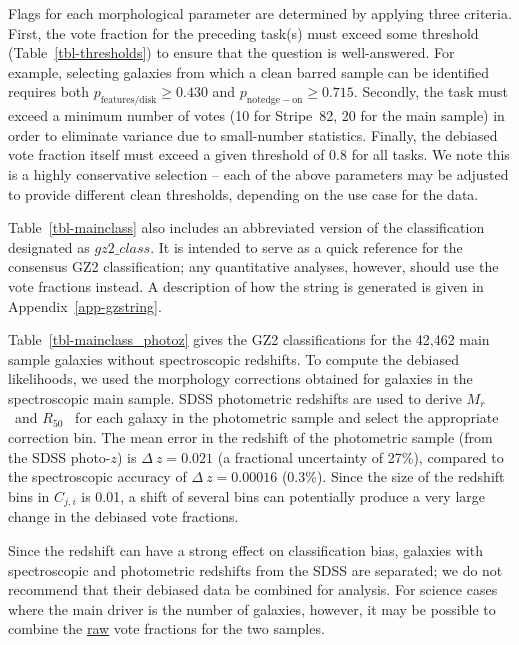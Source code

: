 \documentclass[useAMS,usenatbib]{mn2e}
\newcommand{\mr}{$M_r$}
\newcommand{\rfifty}{$R_{50}$}
\begin{document}
Flags for each morphological parameter are determined by applying three criteria. First, the vote fraction for the preceding task(s) must exceed some threshold (Table~\ref{tbl-thresholds}) to ensure that the question is well-answered. For example, selecting galaxies from which a clean barred sample can be identified requires both $p_\mathrm{features/disk}\geq0.430$ and $p_\mathrm{not edge-on}\geq0.715$. Secondly, the task must exceed a minimum number of votes (10 for Stripe~82, 20 for the main sample) in order to eliminate variance due to small-number statistics. Finally, the debiased vote fraction itself must exceed a given threshold of 0.8 for all tasks. We note this is a highly conservative selection -- each of the above parameters may be adjusted to provide different clean thresholds, depending on the use case for the data.%

Table~\ref{tbl-mainclass} also includes an abbreviated version of the classification designated as $gz2\_class$. It is intended to serve as a quick reference for the consensus GZ2 classification; any quantitative analyses, however, should use the vote fractions instead. A description of how the string is generated is given in Appendix~\ref{app-gzstring}. 

Table~\ref{tbl-mainclass_photoz} gives the GZ2 classifications for the 42,462 main sample galaxies without spectroscopic redshifts. To compute the debiased likelihoods, we used the morphology corrections obtained for galaxies in the spectroscopic main sample. SDSS photometric redshifts \citep{csa03} are used to derive \mr~and \rfifty~ for each galaxy in the photometric sample and select the appropriate correction bin. The mean error in the redshift of the photometric sample (from the SDSS photo-$z$) is $\Delta~z=0.021$ (a fractional uncertainty of 27\%), compared to the spectroscopic accuracy of $\Delta~z=0.00016$ (0.3\%). Since the size of the redshift bins in $C_{j,i}$ is 0.01, a shift of several bins can potentially produce a very large change in the debiased vote fractions. 

Since the redshift can have a strong effect on classification bias, galaxies with spectroscopic and photometric redshifts from the SDSS are separated; we do not recommend that their debiased data be combined for analysis. For science cases where the main driver is the number of galaxies, however, it may be possible to combine the \underline{raw} vote fractions for the two samples.
\end{document}
